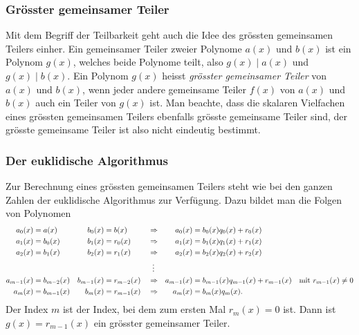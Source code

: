 %
%
\subsubsection{Grösster gemeinsamer Teiler}
Mit dem Begriff der Teilbarkeit geht auch die Idee des grössten
gemeinsamen Teilers einher.
Ein gemeinsamer Teiler zweier Polynome $a(x)$ und $b(x)$ 
%
ist ein Polynom $g(x)$, welches beide Polynome teilt, also
$g(x)\mid a(x)$ und $g(x)\mid b(x)$.
%
%
Ein Polynom $g(x)$ heisst {\em grösster gemeinsamer Teiler} von $a(x)$
und $b(x)$, wenn jeder andere gemeinsame Teiler $f(x)$ von $a(x)$
und $b(x)$ auch ein Teiler von $g(x)$ ist.
Man beachte, dass die skalaren Vielfachen eines grössten gemeinsamen
Teilers ebenfalls grösste gemeinsame Teiler sind, der grösste gemeinsame
Teiler ist also nicht eindeutig bestimmt.

%
%
\subsubsection{Der euklidische Algorithmus}
%
%
Zur Berechnung eines grössten gemeinsamen Teilers steht wie bei den
ganzen Zahlen der euklidische Algorithmus zur Verfügung.
Dazu bildet man die Folgen von Polynomen
\[
\begin{aligned}
a_0(x)&=a(x) & b_0(x) &= b(x)
&
&\Rightarrow&
a_0(x)&=b_0(x) q_0(x) + r_0(x) &&
\\
a_1(x)&=b_0(x) & b_1(x) &= r_0(x)
&
&\Rightarrow&
a_1(x)&=b_1(x) q_1(x) + r_1(x) &&
\\
a_2(x)&=b_1(x) & b_2(x) &= r_1(x)
&
&\Rightarrow&
a_2(x)&=b_2(x) q_2(x) + r_2(x) &&
\\
&&&&&\hspace*{2mm}\vdots&&
\\
a_{m-1}(x)&=b_{m-2}(x) & b_{m-1}(x) &= r_{m-2}(x) 
&
&\Rightarrow&
a_{m-1}(x)&=b_{m-1}(x)q_{m-1}(x) + r_{m-1}(x) &\text{mit }r_{m-1}(x)&\ne 0
\\
a_m(x)&=b_{m-1}(x) & b_m(x)&=r_{m-1}(x)
&
&\Rightarrow&
a_m(x)&=b_m(x)q_m(x).&&
\end{aligned}
\]
Der Index $m$ ist der Index, bei dem zum ersten Mal $r_m(x)=0$ ist.
Dann ist $g(x)=r_{m-1}(x)$ ein grösster gemeinsamer Teiler.

%
%
